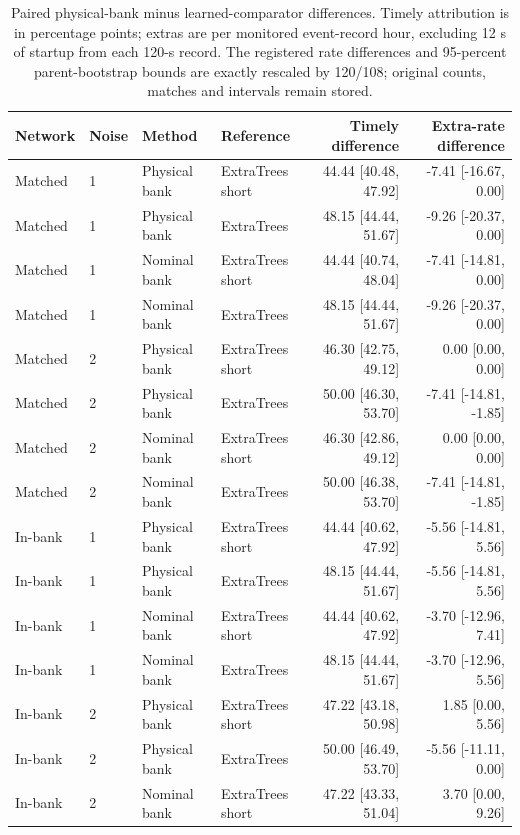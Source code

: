 \begin{table}[t]\centering\small
\caption{Paired physical-bank minus learned-comparator differences. Timely attribution is in percentage points; extras are per monitored event-record hour, excluding 12 s of startup from each 120-s record. The registered rate differences and 95-percent parent-bootstrap bounds are exactly rescaled by 120/108; original counts, matches and intervals remain stored.}
\label{tab:review_paired}
\begin{tabular}{ll ll rr}\toprule
Network & Noise & Method & Reference & Timely difference & Extra-rate difference\\\midrule
Matched & 1 & Physical bank & ExtraTrees short & 44.44 [40.48, 47.92] & -7.41 [-16.67, 0.00]\\
Matched & 1 & Physical bank & ExtraTrees & 48.15 [44.44, 51.67] & -9.26 [-20.37, 0.00]\\
Matched & 1 & Nominal bank & ExtraTrees short & 44.44 [40.74, 48.04] & -7.41 [-14.81, 0.00]\\
Matched & 1 & Nominal bank & ExtraTrees & 48.15 [44.44, 51.67] & -9.26 [-20.37, 0.00]\\
Matched & 2 & Physical bank & ExtraTrees short & 46.30 [42.75, 49.12] & 0.00 [0.00, 0.00]\\
Matched & 2 & Physical bank & ExtraTrees & 50.00 [46.30, 53.70] & -7.41 [-14.81, -1.85]\\
Matched & 2 & Nominal bank & ExtraTrees short & 46.30 [42.86, 49.12] & 0.00 [0.00, 0.00]\\
Matched & 2 & Nominal bank & ExtraTrees & 50.00 [46.38, 53.70] & -7.41 [-14.81, -1.85]\\
In-bank & 1 & Physical bank & ExtraTrees short & 44.44 [40.62, 47.92] & -5.56 [-14.81, 5.56]\\
In-bank & 1 & Physical bank & ExtraTrees & 48.15 [44.44, 51.67] & -5.56 [-14.81, 5.56]\\
In-bank & 1 & Nominal bank & ExtraTrees short & 44.44 [40.62, 47.92] & -3.70 [-12.96, 7.41]\\
In-bank & 1 & Nominal bank & ExtraTrees & 48.15 [44.44, 51.67] & -3.70 [-12.96, 5.56]\\
In-bank & 2 & Physical bank & ExtraTrees short & 47.22 [43.18, 50.98] & 1.85 [0.00, 5.56]\\
In-bank & 2 & Physical bank & ExtraTrees & 50.00 [46.49, 53.70] & -5.56 [-11.11, 0.00]\\
In-bank & 2 & Nominal bank & ExtraTrees short & 47.22 [43.33, 51.04] & 3.70 [0.00, 9.26]\\

\end{tabular}
\end{table}
